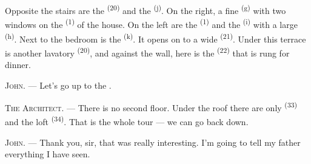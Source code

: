 \VUsaut{3.0mm}
\VUsaut{3.0mm}

Opposite the stairs are the  \textsuperscript{(20)} and the
 \textsuperscript{(j)}. On the right, a fine
 \textsuperscript{(g)} with two windows on the 
\textsuperscript{(1)} of the house. On the left are the 
\textsuperscript{(1)} and the  \textsuperscript{(i)} with a large
 \textsuperscript{(h)}. Next to the bedroom is the
 \textsuperscript{(k)}. It opens on to a wide
 \textsuperscript{(21)}. Under this terrace is another lavatory
\textsuperscript{(20)}, and against the wall, here is the  \textsuperscript{(22)}
that is rung for dinner.

\textsc{John}. --- Let's go up to the .

\textsc{The Architect}. --- There is no second floor. Under the roof there are only
 \textsuperscript{(33)} and the loft \textsuperscript{(34)}. That is the
whole tour --- we can go back down.

\textsc{John}. --- Thank you, sir, that was really interesting. I'm going to tell my father
everything I have seen.
\VUsaut{4.0mm}
\VUfilet{22mm}
